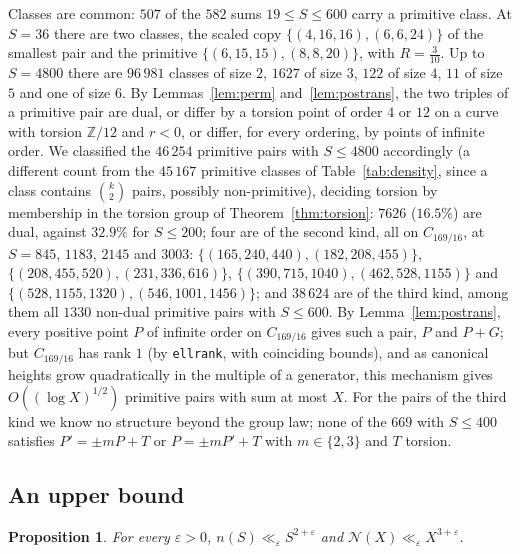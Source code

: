 \documentclass[11pt]{amsart}
\newtheorem{proposition}[theorem]{Proposition}
\theoremstyle{definition}
\theoremstyle{remark}
\newcommand{\Z}{\mathbb{Z}}
\newcommand{\N}{\mathcal{N}}
\begin{document}
Classes are common: $507$ of the $582$ sums $19\le S\le600$ carry a primitive class. At $S=36$ there are two classes, the scaled copy $\{(4,16,16),(6,6,24)\}$ of the smallest pair and the primitive $\{(6,15,15),(8,8,20)\}$, with $R=\frac3{10}$. Up to $S=4800$ there are $96\,981$ classes of size $2$, $1627$ of size $3$, $122$ of size $4$, $11$ of size $5$ and one of size $6$. By Lemmas~\ref{lem:perm} and~\ref{lem:postrans}, the two triples of a primitive pair are dual, or differ by a torsion point of order $4$ or $12$ on a curve with torsion $\Z/12$ and $r<0$, or differ, for every ordering, by points of infinite order. We classified the $46\,254$ primitive pairs with $S\le4800$ accordingly (a different count from the $45\,167$ primitive classes of Table~\ref{tab:density}, since a class contains $\binom k2$ pairs, possibly non-primitive), deciding torsion by membership in the torsion group of Theorem~\ref{thm:torsion}: $7626$ ($16.5\%$) are dual, against $32.9\%$ for $S\le200$; four are of the second kind, all on $C_{169/16}$, at $S=845$, $1183$, $2145$ and $3003$: $\{(165,240,440),(182,208,455)\}$, $\{(208,455,520),(231,336,616)\}$, $\{(390,715,1040),(462,528,1155)\}$ and $\{(528,1155,1320),(546,1001,1456)\}$; and $38\,624$ are of the third kind, among them all $1330$ non-dual primitive pairs with $S\le600$. By Lemma~\ref{lem:postrans}, every positive point $P$ of infinite order on $C_{169/16}$ gives such a pair, $P$ and $P+G$; but $C_{169/16}$ has rank $1$ (by \texttt{ellrank}, with coinciding bounds), and as canonical heights grow quadratically in the multiple of a generator, this mechanism gives $O((\log X)^{1/2})$ primitive pairs with sum at most $X$. For the pairs of the third kind we know no structure beyond the group law; none of the $669$ with $S\le400$ satisfies $P'=\pm mP+T$ or $P=\pm mP'+T$ with $m\in\{2,3\}$ and $T$ torsion.

\subsection{An upper bound}

\begin{proposition}\label{prop:upper}
For every $\varepsilon>0$, $n(S)\ll_\varepsilon S^{2+\varepsilon}$ and $\N(X)\ll_\varepsilon X^{3+\varepsilon}$.
\end{proposition}
\end{document}
